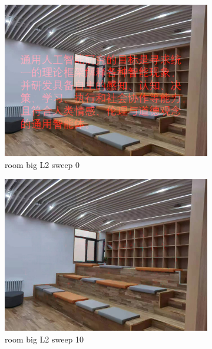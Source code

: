 \documentclass[11pt]{article}
\begin{document}
\begin{figure}[ht!]
    \centering
    \hfill%
    \begin{subfigure}[]{0.333\linewidth}
        \centering
        \includegraphics[width=\linewidth]{fig/restoration/room_big/L2/gibbs_0.jpg}
        \caption{room big L2 sweep 0}
    \end{subfigure}%
    \hfill%
    \begin{subfigure}[]{0.333\linewidth}
        \centering
        \includegraphics[width=\linewidth]{fig/restoration/room_big/L2/gibbs_10.jpg}
        \caption{room big L2 sweep 10}
    \end{subfigure}%
    \hfill%
    \begin{subfigure}[]{0.333\linewidth}

\end{subfigure}
\end{figure}
\end{document}
